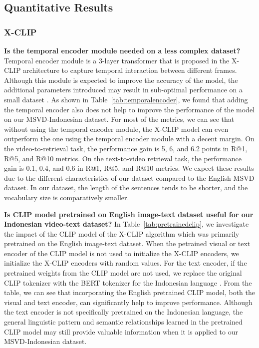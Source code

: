 \documentclass{article}
\begin{document}
\subsection{Quantitative Results}
\subsubsection{X-CLIP}
\textbf{Is the temporal encoder module needed on a less complex dataset?}
Temporal encoder module \cite{10.1145/3474085.3479207} is a 3-layer transformer that is proposed in the X-CLIP architecture to capture temporal interaction between different frames. Although this module is expected to improve the accuracy of the model, the additional parameters introduced may result in sub-optimal performance on a small dataset \cite{LUO2022293}. As shown in Table~\ref{tab:temporalencoder}, we found that adding the temporal encoder also does not help to improve the performance of the model on our MSVD-Indonesian dataset. For most of the metrics, we can see that without using the temporal encoder module, the X-CLIP model can even outperform the one using the temporal encoder module with a decent margin. On the video-to-retrieval task, the performance gain is 5, 6, and 6.2 points in R@1, R@5, and R@10 metrics. On the text-to-video retrieval task, the performance gain is 0.1, 0.4, and 0.6 in R@1, R@5, and R@10 metrics. We expect these results due to the different characteristics of our dataset compared to the English MSVD dataset. In our dataset, the length of the sentences tends to be shorter, and the vocabulary size is comparatively smaller.

\textbf{Is CLIP model pretrained on English image-text dataset useful for our Indonesian video-text dataset?}
In Table~\ref{tab:pretrainedclip}, we investigate the impact of the CLIP model of the X-CLIP algorithm which was primarily pretrained on the English image-text dataset. When the petrained visual or text encoder of the CLIP model is not used to initialize the X-CLIP encoders, we initialize the X-CLIP encoders with random values. For the text encoder, if the pretrained weights from the CLIP model are not used, we replace the original CLIP tokenizer with the BERT tokenizer for the Indonesian language \cite{koto2020indolem}. From the table, we can see that incorporating the English pretrained CLIP model, both the visual and text encoder, can significantly help to improve performance. Although the text encoder is not specifically pretrained on the Indonesian language, the general linguistic pattern and semantic relationships learned in the pretrained CLIP model may still provide valuable information when it is applied to our MSVD-Indonesian dataset.
\end{document}
